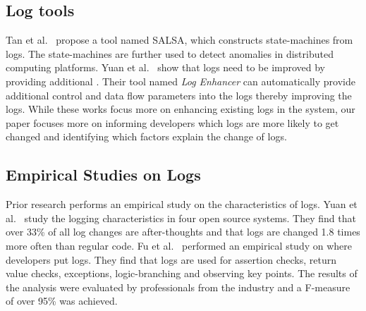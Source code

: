 %
%
\subsection {Log tools}

Tan {et al}$ . $~\cite{TanSalsa} propose a tool named SALSA, which constructs state-machines from logs. The state-machines are further used to detect anomalies in distributed computing platforms. Yuan {et al$ . $}~\cite{Yuan} show that logs need to be improved by providing additional . Their tool named \emph{Log Enhancer} can automatically provide additional control and data flow parameters into the logs thereby improving the logs. While these works focus more on enhancing existing logs in the system, our paper focuses more on informing developers which logs are more likely to get changed and identifying which factors explain the change of logs. 




\subsection{Empirical Studies on Logs}


Prior research performs an empirical study on the characteristics of logs. Yuan {et al}$ . $~\cite{Characterizinglogs} study the logging characteristics in four open source systems. They find that over 33\% of all log changes are after-thoughts and that logs are changed 1.8 times more often than regular code. Fu {et al$.$}~\cite{Fu1} performed an empirical study on where developers put logs. They find that logs are used for assertion checks, return value checks, exceptions, logic-branching and observing key points. The results of the analysis were evaluated by professionals from the industry and a F-measure of over 95\% was achieved. 

